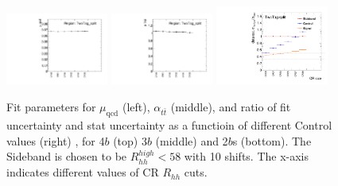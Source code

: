 \begin{figure}[htbp!]
\begin{center}
\includegraphics[width=0.3\textwidth,angle=-90]{figures/boosted/Appendix_SB/TwoTag_split_muqcdCR.pdf}
\includegraphics[width=0.3\textwidth,angle=-90]{figures/boosted/Appendix_SB/TwoTag_split_mutopCR.pdf}
\includegraphics[width=0.33\textwidth,angle=-90]{figures/boosted/Appendix_SB/data_est_TwoTag_split_sigma_compareCR.pdf}
  \caption{Fit parameters for $\mu_{\text{qcd}}$ (left), $\alpha_{t\bar{t}}$ (middle), and ratio of fit uncertainty and stat uncertainty as a functioin of different Control values (right) , for 4$b$ (top) 3$b$ (middle) and 2$b$s (bottom). The Sideband is chosen to be $R_{hh}^{high} < 58$ with 10 \GeV shifts. The x-axis indicates different values of CR $R_{hh}$ cuts.}
  \label{fig:app-sb-muqcd-diffCR}
\end{center}
\end{figure}
